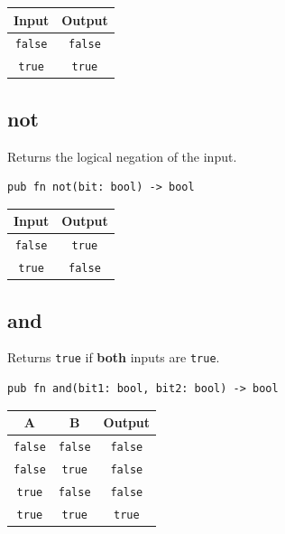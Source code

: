 \documentclass[a4paper,12pt]{report}
\begin{document}
\begin{center}
\begin{tabular}{|c|c|}
\hline
\rowcolor{gray!20} \textbf{Input} & \textbf{Output} \\ \hline
\texttt{false} & \texttt{false} \\ \hline
\texttt{true} & \texttt{true} \\ \hline
\end{tabular}
\end{center}

\subsection*{not}
Returns the logical negation of the input.

\begin{lstlisting}
pub fn not(bit: bool) -> bool
\end{lstlisting}

\begin{center}
\begin{tabular}{|c|c|}
\hline
\rowcolor{gray!20} \textbf{Input} & \textbf{Output} \\ \hline
\texttt{false} & \texttt{true} \\ \hline
\texttt{true} & \texttt{false} \\ \hline
\end{tabular}
\end{center}

\vspace{1cm}

\subsection*{and}
Returns \texttt{true} if \textbf{both} inputs are \texttt{true}.

\begin{lstlisting}
pub fn and(bit1: bool, bit2: bool) -> bool
\end{lstlisting}

\begin{center}
\begin{tabular}{|c|c|c|}
\hline
\rowcolor{gray!20} \textbf{A} & \textbf{B} & \textbf{Output} \\ \hline
\texttt{false} & \texttt{false} & \texttt{false} \\ \hline
\texttt{false} & \texttt{true} & \texttt{false} \\ \hline
\texttt{true} & \texttt{false} & \texttt{false} \\ \hline
\texttt{true} & \texttt{true} & \texttt{true} \\ \hline
\end{tabular}
\end{center}
\end{document}
